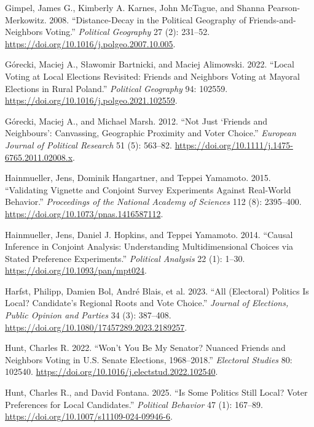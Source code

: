 \documentclass[
  letterpaper,
  DIV=11,
  numbers=noendperiod]{scrartcl}
\newlength{\cslhangindent}
\newenvironment{CSLReferences}[2] %
 {\begin{list}{}{%
  \setlength{\itemindent}{0pt}
  \setlength{\leftmargin}{0pt}
  \setlength{\parsep}{0pt}
  \ifodd #1
   \setlength{\leftmargin}{\cslhangindent}
   \setlength{\itemindent}{-1\cslhangindent}
  \fi
  \setlength{\itemsep}{#2\baselineskip}}}
 {\end{list}}
\begin{document}
\begin{CSLReferences}{1}{1}
Gimpel, James G., Kimberly A. Karnes, John McTague, and Shanna
Pearson-Merkowitz. 2008. {``Distance-Decay in the Political Geography of
Friends-and-Neighbors Voting.''} \emph{Political Geography} 27 (2):
231--52. \url{https://doi.org/10.1016/j.polgeo.2007.10.005}.

Górecki, Maciej A., Sławomir Bartnicki, and Maciej Alimowski. 2022.
{``Local Voting at Local Elections Revisited: Friends and Neighbors
Voting at Mayoral Elections in Rural Poland.''} \emph{Political
Geography} 94: 102559.
\url{https://doi.org/10.1016/j.polgeo.2021.102559}.

Górecki, Maciej A., and Michael Marsh. 2012. {``Not Just {`Friends and
Neighbours'}: Canvassing, Geographic Proximity and Voter Choice.''}
\emph{European Journal of Political Research} 51 (5): 563--82.
\url{https://doi.org/10.1111/j.1475-6765.2011.02008.x}.

Hainmueller, Jens, Dominik Hangartner, and Teppei Yamamoto. 2015.
{``Validating Vignette and Conjoint Survey Experiments Against
Real-World Behavior.''} \emph{Proceedings of the National Academy of
Sciences} 112 (8): 2395--400.
\url{https://doi.org/10.1073/pnas.1416587112}.

Hainmueller, Jens, Daniel J. Hopkins, and Teppei Yamamoto. 2014.
{``Causal Inference in Conjoint Analysis: Understanding Multidimensional
Choices via Stated Preference Experiments.''} \emph{Political Analysis}
22 (1): 1--30. \url{https://doi.org/10.1093/pan/mpt024}.

Harfst, Philipp, Damien Bol, André Blais, et al. 2023. {``All
(Electoral) Politics Is Local? Candidate's Regional Roots and Vote
Choice.''} \emph{Journal of Elections, Public Opinion and Parties} 34
(3): 387--408. \url{https://doi.org/10.1080/17457289.2023.2189257}.

Hunt, Charles R. 2022. {``Won't You Be My Senator? Nuanced Friends and
Neighbors Voting in {U.S.} Senate Elections, 1968--2018.''}
\emph{Electoral Studies} 80: 102540.
\url{https://doi.org/10.1016/j.electstud.2022.102540}.

Hunt, Charles R., and David Fontana. 2025. {``Is Some Politics Still
Local? Voter Preferences for Local Candidates.''} \emph{Political
Behavior} 47 (1): 167--89.
\url{https://doi.org/10.1007/s11109-024-09946-6}.


\end{CSLReferences}
\end{document}
